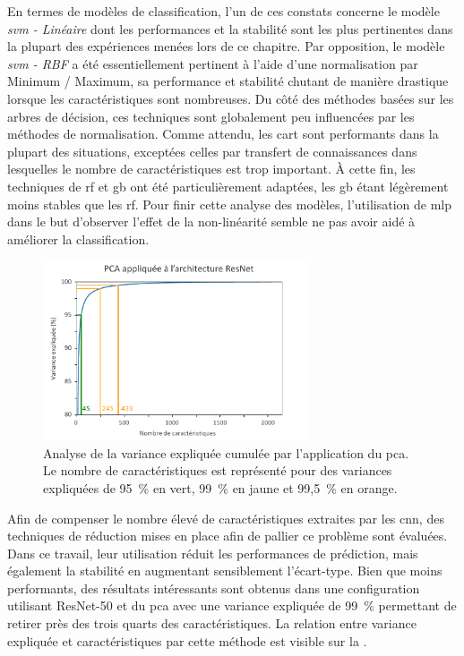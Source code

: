 En termes de modèles de classification, l'un de ces constats concerne le modèle \textit{\gls{svm} - Linéaire} dont les performances et la stabilité sont les plus pertinentes dans la plupart des expériences menées lors de ce chapitre. Par opposition, le modèle \textit{\gls{svm} - RBF} a été essentiellement pertinent à l'aide d'une normalisation par Minimum / Maximum, sa performance et stabilité chutant de manière drastique lorsque les caractéristiques sont nombreuses. Du côté des méthodes basées sur les arbres de décision, ces techniques sont globalement peu influencées par les méthodes de normalisation. Comme attendu, les \gls{cart} sont performants dans la plupart des situations, exceptées celles par transfert de connaissances dans lesquelles le nombre de caractéristiques est trop important. À cette fin, les techniques de \gls{rf} et \gls{gb} ont été particulièrement adaptées, les \gls{gb} étant légèrement moins stables que les \gls{rf}. Pour finir cette analyse des modèles, l'utilisation de \gls{mlp} dans le but d'observer l'effet de la non-linéarité semble ne pas avoir aidé à améliorer la classification.\par

\begin{figure}[H]
    \centering
    \includegraphics[width=0.7\textwidth]{contents/chapter_5/resources/results_image_classification_pca_variance.pdf}
    \caption{Analyse de la variance expliquée cumulée par l'application du \gls{pca}. Le nombre de caractéristiques est représenté pour des variances expliquées de 95~\% en vert, 99~\% en jaune et 99,5~\% en orange.}
    \label{fig:results_image_classification_pca_variance}
\end{figure}\par

Afin de compenser le nombre élevé de caractéristiques extraites par les \gls{cnn}, des techniques de réduction mises en place afin de pallier ce problème sont évaluées. Dans ce travail, leur utilisation réduit les performances de prédiction, mais également la stabilité en augmentant sensiblement l'écart-type. Bien que moins performants, des résultats intéressants sont obtenus dans une configuration utilisant ResNet-50 et du \gls{pca} avec une variance expliquée de 99~\% permettant de retirer près des trois quarts des caractéristiques. La relation entre variance expliquée et caractéristiques par cette méthode est visible sur la .\par

